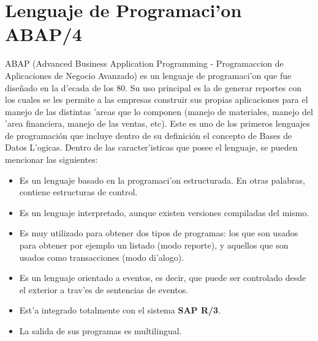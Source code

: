 \section{Lenguaje de Programaci'on ABAP/4}
ABAP (Advanced Business Application Programming - Programaccion de Aplicaciones de Negocio Avanzado) es un lenguaje de programaci'on que fue dise\~nado en la d'ecada de los 80. Su uso principal es la de generar reportes con los cuales se les permite a las empresas construir sus propias aplicaciones para el manejo de las distintas 'areas que lo componen (manejo de materiales, manejo del 'area financiera, manejo de las ventas, etc).
Este es uno de los primeros lenguajes de programación que incluye dentro de su definición el concepto de Bases de Datos L'ogicas. 
Dentro de las caracter'isticas que posee el lenguaje, se pueden mencionar las siguientes:
\begin{itemize}
\item Es un lenguaje basado en la programaci'on estructurada. En otras palabras, contiene estructuras de control.
\item Es un lenguaje interpretado, aunque existen versiones compiladas del mismo.
\item Es muy utilizado para obtener dos tipos de programas: los que son usados para obtener por ejemplo un listado (modo reporte), y aquellos que son usados como transacciones (modo di'alogo).
\item Es un lenguaje orientado a eventos, es decir, que puede ser controlado desde el exterior a trav'es de sentencias de eventos.
\item Est'a integrado totalmente con el sistema \textbf{SAP R/3}.
\item La salida de sus programas es multilingual. 
\end{itemize}


